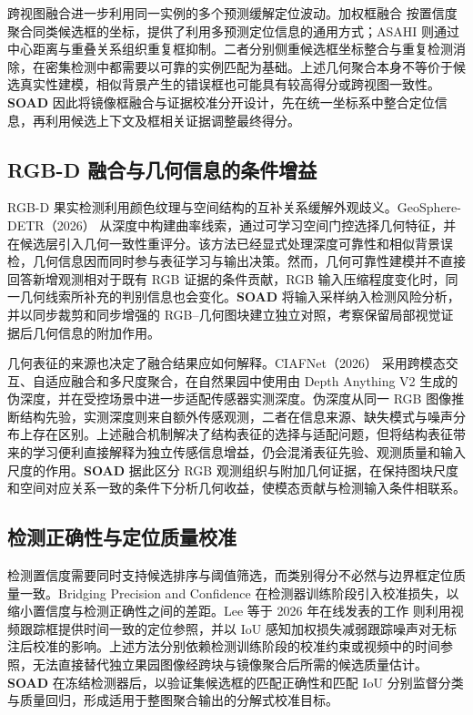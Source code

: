 \documentclass[11pt,a4paper]{ctexart}
\begin{document}
跨视图融合进一步利用同一实例的多个预测缓解定位波动。加权框融合 \cite{wbf} 按置信度聚合同类候选框的坐标，提供了利用多预测定位信息的通用方式；ASAHI \cite{asahi} 则通过中心距离与重叠关系组织重复框抑制。二者分别侧重候选框坐标整合与重复检测消除，在密集检测中都需要以可靠的实例匹配为基础。上述几何聚合本身不等价于候选真实性建模，相似背景产生的错误框也可能具有较高得分或跨视图一致性。\textbf{SOAD} 因此将镜像框融合与证据校准分开设计，先在统一坐标系中整合定位信息，再利用候选上下文及框相关证据调整最终得分。

\subsection{RGB-D 融合与几何信息的条件增益}
RGB-D 果实检测利用颜色纹理与空间结构的互补关系缓解外观歧义。GeoSphere-DETR（2026）\cite{geosphere} 从深度中构建曲率线索，通过可学习空间门控选择几何特征，并在候选层引入几何一致性重评分。该方法已经显式处理深度可靠性和相似背景误检，几何信息因而同时参与表征学习与输出决策。然而，几何可靠性建模并不直接回答新增观测相对于既有 RGB 证据的条件贡献，RGB 输入压缩程度变化时，同一几何线索所补充的判别信息也会变化。\textbf{SOAD} 将输入采样纳入检测风险分析，并以同步裁剪和同步增强的 RGB--几何图块建立独立对照，考察保留局部视觉证据后几何信息的附加作用。

几何表征的来源也决定了融合结果应如何解释。CIAFNet（2026）\cite{ciafnet} 采用跨模态交互、自适应融合和多尺度聚合，在自然果园中使用由 Depth Anything V2 生成的伪深度，并在受控场景中进一步适配传感器实测深度。伪深度从同一 RGB 图像推断结构先验，实测深度则来自额外传感观测，二者在信息来源、缺失模式与噪声分布上存在区别。上述融合机制解决了结构表征的选择与适配问题，但将结构表征带来的学习便利直接解释为独立传感信息增益，仍会混淆表征先验、观测质量和输入尺度的作用。\textbf{SOAD} 据此区分 RGB 观测组织与附加几何证据，在保持图块尺度和空间对应关系一致的条件下分析几何收益，使模态贡献与检测输入条件相联系。

\subsection{检测正确性与定位质量校准}
检测置信度需要同时支持候选排序与阈值筛选，而类别得分不必然与边界框定位质量一致。Bridging Precision and Confidence \cite{bpc} 在检测器训练阶段引入校准损失，以缩小置信度与检测正确性之间的差距。Lee 等于 2026 年在线发表的工作 \cite{trackcal} 则利用视频跟踪框提供时间一致的定位参照，并以 IoU 感知加权损失减弱跟踪噪声对无标注后校准的影响。上述方法分别依赖检测训练阶段的校准约束或视频中的时间参照，无法直接替代独立果园图像经跨块与镜像聚合后所需的候选质量估计。\textbf{SOAD} 在冻结检测器后，以验证集候选框的匹配正确性和匹配 IoU 分别监督分类与质量回归，形成适用于整图聚合输出的分解式校准目标。
\end{document}
